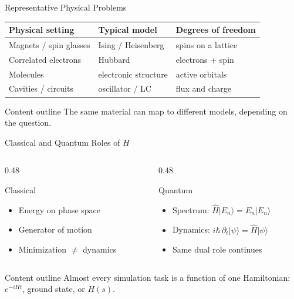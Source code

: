 \documentclass[
	11pt,
	aspectratio=169,
	compress,
]{beamer}
\newcommand{\outlinebox}[1]{%
	\vspace{0.25em}%
	\begin{block}{Content outline}
		#1
	\end{block}
}
\begin{document}
\begin{frame}{Representative Physical Problems}
	\renewcommand{\arraystretch}{1.25}
	\begin{center}
	\small
	\begin{tabular}{@{}lll@{}}
		\toprule
		\textbf{Physical setting} & \textbf{Typical model} & \textbf{Degrees of freedom} \\
		\midrule
		Magnets / spin glasses & Ising / Heisenberg & spins on a lattice \\
		Correlated electrons & Hubbard & electrons + spin \\
		Molecules & electronic structure & active orbitals \\
		Cavities / circuits & oscillator / LC & flux and charge \\
		\bottomrule
	\end{tabular}
	\end{center}
	\outlinebox{The same material can map to different models, depending on the question.}
\end{frame}

\begin{frame}{Classical and Quantum Roles of $H$}
	\begin{columns}[T]
		\begin{column}{0.48\textwidth}
			\begin{block}{Classical}
				\begin{itemize}
					\item Energy on phase space
					\item Generator of motion
					\item Minimization $\neq$ dynamics
				\end{itemize}
			\end{block}
		\end{column}
		\begin{column}{0.48\textwidth}
			\begin{block}{Quantum}
				\begin{itemize}
					\item Spectrum: $\hat H\lvert E_n\rangle=E_n\lvert E_n\rangle$
					\item Dynamics: $i\hbar\,\partial_t\lvert\psi\rangle=\hat H\lvert\psi\rangle$
					\item Same dual role continues
				\end{itemize}
			\end{block}
		\end{column}
	\end{columns}
	\vspace{0.35em}
	\outlinebox{Almost every simulation task is a function of one Hamiltonian: $e^{-iHt}$, ground state, or $H(s)$.}
\end{frame}
\end{document}
